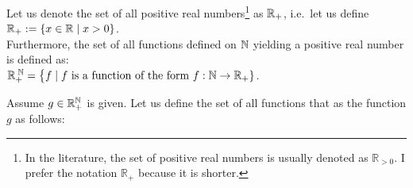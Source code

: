 Let us denote the set of all positive real numbers\footnote{
  In the literature, the set of positive real numbers is usually denoted as $\mathbb{R}_{>0}$.  I prefer the
  notation $\mathbb{R_+}$ because it is shorter.
}
as ${\mathbb R}_+$, i.e.~let us define 
\\[0.2cm]
\hspace*{1.3cm}
${\mathbb R}_+ := \{ x \in {\mathbb R} \mid x > 0 \}$. 
\\[0.2cm]
Furthermore, the set of all functions defined on  ${\mathbb N}$ yielding a positive real number is defined
as: 
\\[0.2cm]
\hspace*{1.3cm} 
${\mathbb R}_+^{\;{\mathbb N}} = \bigl\{ f \mid \mbox{$f$ is a function of the form $f: {\mathbb N} \rightarrow {\mathbb R}_+$} \}$. 

\begin{Definition}[$\Oh(g)$] 
Assume $g \in {\mathbb R}_+^{{\mathbb N}}$ is given.   Let us define the set of all functions that 
  as the function $g$ as follows: 
  \\[0.2cm]
  \hspace*{0.5cm} 
  \colorbox{red}{}
  \eox
\end{Definition}

